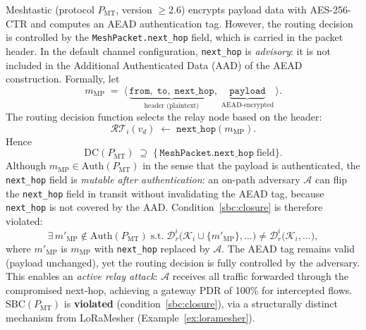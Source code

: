\begin{example}
\label{ex:meshtastic}
Meshtastic (protocol $P_{\mathrm{MT}}$, version $\ge 2.6$) encrypts
payload data with AES-256-CTR and computes an AEAD authentication tag.
However, the routing decision is controlled by the
\texttt{MeshPacket.next\_hop} field, which is carried in the packet
header.  In the default channel configuration, \texttt{next\_hop} is
\emph{advisory}: it is not included in the Additional Authenticated Data
(AAD) of the AEAD construction.  Formally, let
\[
  m_{\mathrm{MP}} \;=\; \langle\,
    \underbrace{\texttt{from},\; \texttt{to},\; \texttt{next\_hop}}_{\text{header (plaintext)}},\;
    \underbrace{\texttt{payload}}_{\text{AEAD-encrypted}}
  \,\rangle.
\]
The routing decision function selects the relay node based on the header:
\[
  \mathcal{RT}_i(v_d) \;\leftarrow\; \texttt{next\_hop}(m_{\mathrm{MP}}).
\]
Hence
\[
  \mathrm{DC}(P_{\mathrm{MT}}) \;\supseteq\;
  \bigl\{\, \texttt{MeshPacket.next\_hop} \;\text{field} \bigr\}.
\]
Although $m_{\mathrm{MP}} \in \mathrm{Auth}(P_{\mathrm{MT}})$ in the sense
that the payload is authenticated, the \texttt{next\_hop} field is
\emph{mutable after authentication}: an on-path adversary $\mathcal{A}$
can flip the \texttt{next\_hop} field in transit without invalidating the
AEAD tag, because \texttt{next\_hop} is not covered by the AAD.
Condition~\ref{sbc:closure} is therefore violated:
\[
  \exists\, m'_{\mathrm{MP}} \notin \mathrm{Auth}(P_{\mathrm{MT}}) \;\text{s.t.}\;
  \mathcal{D}_r^i\!\bigl(\mathcal{K}_i \cup \{m'_{\mathrm{MP}}\},\ldots\bigr)
  \neq
  \mathcal{D}_r^i\!\bigl(\mathcal{K}_i,\ldots\bigr),
\]
where $m'_{\mathrm{MP}}$ is $m_{\mathrm{MP}}$ with \texttt{next\_hop}
replaced by $\mathcal{A}$.  The AEAD tag remains valid (payload
unchanged), yet the routing decision is fully controlled by the adversary.
This enables an \emph{active relay attack}: $\mathcal{A}$ receives all
traffic forwarded through the compromised next-hop, achieving a
gateway PDR of 100\% for intercepted flows.
$\mathrm{SBC}(P_{\mathrm{MT}})$ is \textbf{violated} (condition~\ref{sbc:closure}),
via a structurally distinct mechanism from LoRaMesher
(Example~\ref{ex:loramesher}).
\end{example}

